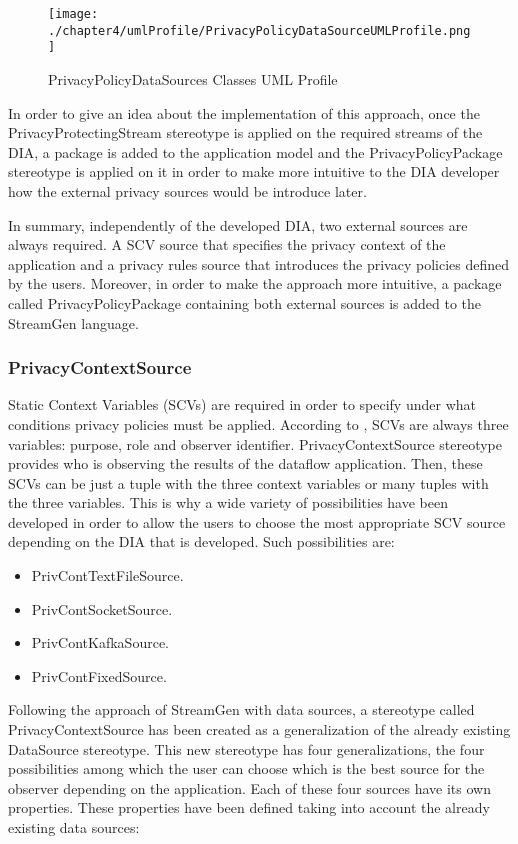 \begin{figure}
\centering
{\texttt{[image: ./chapter4/umlProfile/PrivacyPolicyDataSourceUMLProfile.png]}}
\caption{PrivacyPolicyDataSources Classes UML Profile}
\label{fig:PrivacyPolicyDataSources Classes UML Profile}
\end{figure}

In order to give an idea about the implementation of this approach, once the PrivacyProtectingStream stereotype is applied on the required streams of the DIA, a package is added to the application model and the PrivacyPolicyPackage stereotype is applied on it in order to make more intuitive to the DIA developer how the external privacy sources would be introduce later.

In summary, independently of the developed DIA, two external sources are always required. A SCV source that specifies the privacy context of the application and a privacy rules source that introduces the privacy policies defined by the users. Moreover, in order to make the approach more intuitive, a package called PrivacyPolicyPackage containing both external sources is added to the StreamGen language.

\subsubsection{PrivacyContextSource}

Static Context Variables (SCVs) are required in order to specify under what conditions privacy policies must be applied. According to \cite{privacypoliciesarticle}, SCVs are always three variables: purpose, role and observer identifier. PrivacyContextSource stereotype provides who is observing the results of the dataflow application. Then, these SCVs can be just a tuple with the three context variables or many tuples with the three variables. This is why a wide variety of possibilities have been developed in order to allow the users to choose the most appropriate SCV source depending on the DIA that is developed. Such possibilities are:

\begin{itemize}
\item PrivContTextFileSource.
\item PrivContSocketSource.
\item PrivContKafkaSource.
\item PrivContFixedSource.
\end{itemize}

Following the approach of StreamGen with data sources, a stereotype called PrivacyContextSource has been created as a generalization of the already existing DataSource stereotype. This new stereotype has four generalizations, the four possibilities among which the user can choose which is the best source for the observer depending on the application. Each of these four sources have its own properties. These properties have been defined taking into account the already existing data sources:

